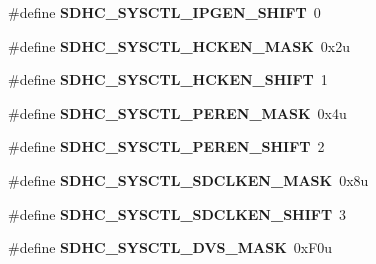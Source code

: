 \begin{DoxyCompactItemize}
\item 
\#define {\bfseries S\+D\+H\+C\+\_\+\+S\+Y\+S\+C\+T\+L\+\_\+\+I\+P\+G\+E\+N\+\_\+\+S\+H\+I\+FT}~0\hypertarget{group__SDHC__Register__Masks_ga9ef6104b46076dd92183a99579d95771}{}\label{group__SDHC__Register__Masks_ga9ef6104b46076dd92183a99579d95771}

\item 
\#define {\bfseries S\+D\+H\+C\+\_\+\+S\+Y\+S\+C\+T\+L\+\_\+\+H\+C\+K\+E\+N\+\_\+\+M\+A\+SK}~0x2u\hypertarget{group__SDHC__Register__Masks_gaefb48b61c548dd73ba8ae645d6e0c889}{}\label{group__SDHC__Register__Masks_gaefb48b61c548dd73ba8ae645d6e0c889}

\item 
\#define {\bfseries S\+D\+H\+C\+\_\+\+S\+Y\+S\+C\+T\+L\+\_\+\+H\+C\+K\+E\+N\+\_\+\+S\+H\+I\+FT}~1\hypertarget{group__SDHC__Register__Masks_gab4bc40b459bbe0c405262109e6765e69}{}\label{group__SDHC__Register__Masks_gab4bc40b459bbe0c405262109e6765e69}

\item 
\#define {\bfseries S\+D\+H\+C\+\_\+\+S\+Y\+S\+C\+T\+L\+\_\+\+P\+E\+R\+E\+N\+\_\+\+M\+A\+SK}~0x4u\hypertarget{group__SDHC__Register__Masks_ga23b3d2c76db562da51b824fa435f306c}{}\label{group__SDHC__Register__Masks_ga23b3d2c76db562da51b824fa435f306c}

\item 
\#define {\bfseries S\+D\+H\+C\+\_\+\+S\+Y\+S\+C\+T\+L\+\_\+\+P\+E\+R\+E\+N\+\_\+\+S\+H\+I\+FT}~2\hypertarget{group__SDHC__Register__Masks_ga28db53e7da45cb7a0ed9de6c7bac7a85}{}\label{group__SDHC__Register__Masks_ga28db53e7da45cb7a0ed9de6c7bac7a85}

\item 
\#define {\bfseries S\+D\+H\+C\+\_\+\+S\+Y\+S\+C\+T\+L\+\_\+\+S\+D\+C\+L\+K\+E\+N\+\_\+\+M\+A\+SK}~0x8u\hypertarget{group__SDHC__Register__Masks_ga19de408b244a32169fec30115c0b8a4a}{}\label{group__SDHC__Register__Masks_ga19de408b244a32169fec30115c0b8a4a}

\item 
\#define {\bfseries S\+D\+H\+C\+\_\+\+S\+Y\+S\+C\+T\+L\+\_\+\+S\+D\+C\+L\+K\+E\+N\+\_\+\+S\+H\+I\+FT}~3\hypertarget{group__SDHC__Register__Masks_ga4dbc0c5f5a10fdd6b7fb6642f10548df}{}\label{group__SDHC__Register__Masks_ga4dbc0c5f5a10fdd6b7fb6642f10548df}

\item 
\#define {\bfseries S\+D\+H\+C\+\_\+\+S\+Y\+S\+C\+T\+L\+\_\+\+D\+V\+S\+\_\+\+M\+A\+SK}~0x\+F0u\hypertarget{group__SDHC__Register__Masks_ga8311f017ab13388163976f2e422d072d}{}\label{group__SDHC__Register__Masks_ga8311f017ab13388163976f2e422d072d}


\end{DoxyCompactItemize}
